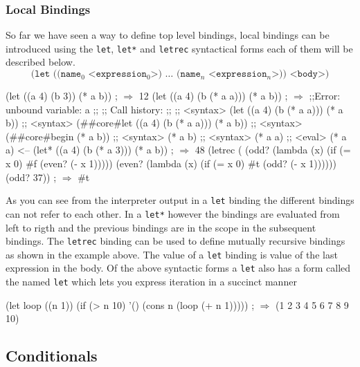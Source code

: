 \documentclass[12pt,a4paper,english,twoside]{article}
\begin{document}
\subsubsection{Local Bindings}
So far we have seen a way to define top level bindings, local bindings can be 
introduced using the \texttt{let}, \texttt{let*} and \texttt{letrec} 
syntactical forms each of them will be described below.
\begin{equation*}
\texttt{(let ((name$_{0}$ <expression$_{0}$>) $\dots$ (name$_{n}$ <expression$_{n}$>)) <body>)}
\end{equation*}
\begin{listing}
\begin{schemecode}
(let ((a 4) (b 3)) (* a b)) ; $\Rightarrow$ 12
(let ((a 4) (b (* a a))) (* a b)) ; $\Rightarrow$
;;Error: unbound variable: a
;;
;;	Call history:
;;
;;	<syntax>	  (let ((a 4) (b (* a a))) (* a b))
;;	<syntax>	  (##core#let ((a 4) (b (* a a))) (* a b))
;;	<syntax>	  (##core#begin (* a b))
;;	<syntax>	  (* a b)
;;	<syntax>	  (* a a)
;;	<eval>	  (* a a)	<--
(let* ((a 4) (b (* a 3))) (* a b)) ; $\Rightarrow$ 48
(letrec (
  (odd? (lambda (x) (if (= x 0) #f (even? (- x 1))))) 
  (even? (lambda (x) (if (= x 0) #t (odd? (- x 1)))))) 
    (odd? 37)) ; $\Rightarrow$ #t
\end{schemecode}
\end{listing}
As you can see from the interpreter output in a \texttt{let} binding the 
different bindings can not refer to each other. In a \texttt{let*} however the 
bindings are evaluated from left to rigth and the previous bindings are in the 
scope in the subsequent bindings. The \texttt{letrec} binding can be used to 
define mutually recursive bindings as shown in the example above. The value 
of a \texttt{let} binding is value of the last expression in the body. Of the above 
syntactic forms a \texttt{let} also has a form called the named \texttt{let} 
which lets you express iteration in a succinct manner
\begin{schemecode}
(let loop ((n 1))
  (if (> n 10)
    '()
    (cons n (loop (+ n 1))))) ; $\Rightarrow$ (1 2 3 4 5 6 7 8 9 10)
\end{schemecode}
\subsection{Conditionals}
 
\end{document}
